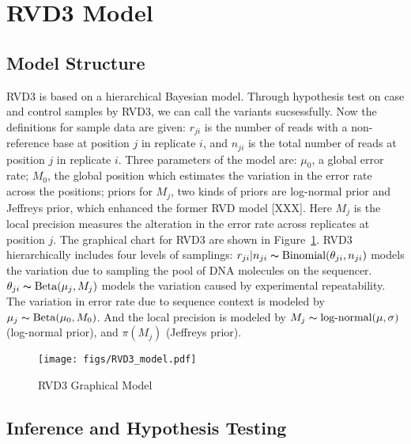 \documentclass[11pt,reqno]{amsart}
\begin{document}
\section{RVD3 Model}

\subsection{Model Structure}\label{sec:model_structure}
RVD3 is based on a hierarchical Bayesian model. Through hypothesis test on case and control samples by RVD3, we can call the variants sucsessfully. Now the definitions for sample data are given: $r_{ji}$ is the number of reads with a non-reference base at position $j$ in replicate $i$, and $n_{ji}$ is the total number of reads at position $j$ in replicate $i$. Three parameters of the model are: $\mu_0$, a global error rate; $M_0$, the global position which estimates the variation in the error rate across the positions; priors for $M_j$, two kinds of priors are log-normal prior and Jeffreys prior, which enhanced the former RVD model [XXX]. Here $M_j$ is the local precision measures the alteration in the error rate across replicates at position $j$. The graphical chart for RVD3 are shown in Figure~\ref{fig:graphical_model}.
RVD3 hierarchically includes four levels of samplings: $r_{ji} | n_{ji} \thicksim \text{Binomial}(\theta_{ji}, n_{ji})$ models the variation due to sampling the pool of DNA molecules on the sequencer. $\theta_{ji} \thicksim \text{Beta}(\mu_j, M_j)$ models the variation caused by experimental repeatability. The variation in error rate due to sequence context is modeled by $\mu_j \thicksim \text{Beta}(\mu_0, M_0)$. And the local precision is modeled by $ M_{j} \thicksim \text{log-normal}(\mu, \sigma)$ (log-normal prior), and $\pi\left({M}_{j}\right)$ (Jeffreys prior).

\begin{figure}[h]
\begin{center}
\texttt{[image: figs/RVD3\_model.pdf]}
\caption{RVD3 Graphical Model}
\label{fig:graphical_model}
\end{center}
\end{figure}


\subsection{Inference and Hypothesis Testing}
\end{document}
